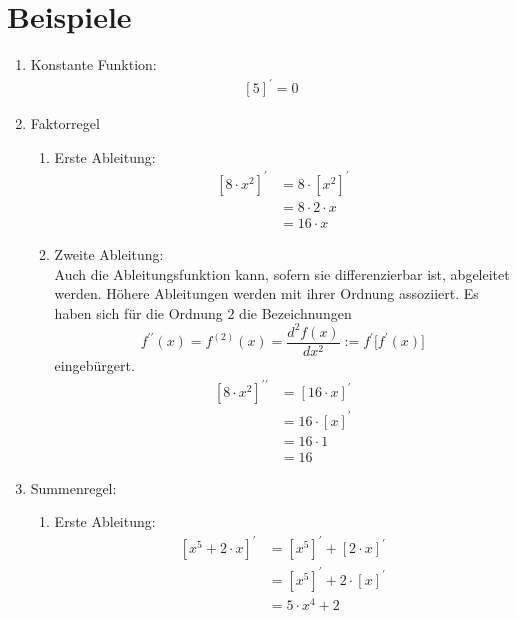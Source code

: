 \documentclass[11pt, a4paper]{report}
\begin{document}
\section*{Beispiele} %
\begin{enumerate}
	\item Konstante Funktion:
		\begin{align*}
		\left[ 5 \right]^{\prime} = 0
		\end{align*}	 
	\item Faktorregel 
		\begin{enumerate}
			\item Erste Ableitung:
				\begin{align*}
				\left[ 8\cdot x^{2} \right]^{\prime} &= 8\cdot \left[ x^{2} \right]^{\prime}\\
				&= 8 \cdot 2 \cdot x \\
				&= 16 \cdot x
				\end{align*}
			\item Zweite Ableitung:\\
				Auch die Ableitungsfunktion kann, sofern sie differenzierbar ist, abgeleitet werden. Höhere Ableitungen werden mit ihrer 						Ordnung assoziiert. Es haben sich für die Ordnung $2$ die Bezeichnungen 
				\begin{equation}
				f^{\prime\prime}(x)= f^{(2)}(x) =\dfrac{d^{2}f(x)}{dx^{2}} := f^{\prime}\lbrack f^{\prime}(x)\rbrack 
				\end{equation}
				eingebürgert.
				\begin{align*}
				\left[ 8\cdot x^{2} \right]^{\prime\prime} &= \left[ 16 \cdot x \right]^{\prime}\\
				&= 16 \cdot \left[ x \right]^{\prime}\\
				&= 16 \cdot 1 \\
				&= 16
				\end{align*}
		\end{enumerate}
	\item Summenregel:
		\begin{enumerate}
			\item Erste Ableitung:
				\begin{align*}
				\left[ x^{5} + 2 \cdot x \right]^{\prime} &= \left[ x^{5} \right]^{\prime} + \left[ 2\cdot x \right]^{\prime} \\
				&= \left[ x^{5} \right]^{\prime} + 2\cdot \left[ x \right]^{\prime}\\
				&= 5\cdot x^{4} + 2
				\end{align*}

\end{enumerate}
\end{enumerate}
\end{document}
